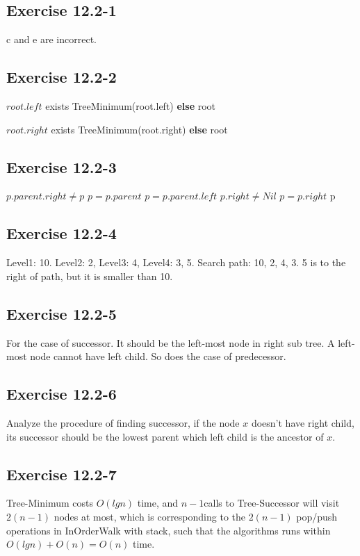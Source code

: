 \documentclass[12pt]{article}
\theoremstyle{definition}
\theoremstyle{remark}
\begin{document}
\subsection*{Exercise 12.2-1}
c and e are incorrect.
\subsection*{Exercise 12.2-2}
\begin{codebox}
\li \If $root.left$ exists \label{li:if}
\li \quad \Return TreeMinimum(root.left)
\li \textbf{else}
\li \quad \Return root
\end{codebox}
\begin{codebox}
\li \If $root.right$ exists \label{li:if}
\li \quad \Return TreeMinimum(root.right)
\li \textbf{else}
\li \quad \Return root
\end{codebox}
\subsection*{Exercise 12.2-3}
\begin{codebox}
\li \While $p.parent.right\ne p$ \label{li:while}
\li \quad $p=p.parent$
\li $p=p.parent.left$
\li \While $p.right\ne Nil$
\li \quad $p=p.right$
\li \Return p
\end{codebox}
\subsection*{Exercise 12.2-4}
Level1: 10. Level2: 2, Level3: 4, Level4: 3, 5. Search path: 10, 2, 4, 3. 5 is to the right of path, but it is smaller than 10.
\subsection*{Exercise 12.2-5}
For the case of successor. It should be the left-most node in right sub tree. A left-most node cannot have left child. So does the case of predecessor.
\subsection*{Exercise 12.2-6}
Analyze the procedure of finding successor, if the node $x$ doesn't have right child, its successor should be the lowest parent which left child is the ancestor of $x$.
\subsection*{Exercise 12.2-7}
Tree-Minimum costs $O(lgn)$ time, and $n-1$calls to Tree-Successor will visit $2(n-1)$ nodes at most, which is corresponding to the $2(n-1)$ pop/push operations in InOrderWalk with stack, such that the algorithms runs within $O(lgn)+O(n)=O(n)$ time.
\end{document}
